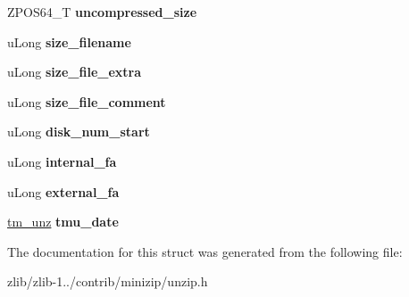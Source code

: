 \begin{DoxyCompactItemize}
\item 
\hypertarget{structunz__file__info64__s_a8cf74465a9d0641cdf1bb22c33f09b42}{Z\+P\+O\+S64\+\_\+\+T {\bfseries uncompressed\+\_\+size}}\label{structunz__file__info64__s_a8cf74465a9d0641cdf1bb22c33f09b42}

\item 
\hypertarget{structunz__file__info64__s_ac09e3b96910b5f98ec73688116b6b3fd}{u\+Long {\bfseries size\+\_\+filename}}\label{structunz__file__info64__s_ac09e3b96910b5f98ec73688116b6b3fd}

\item 
\hypertarget{structunz__file__info64__s_a12af3fa77dc4f7f28448d68703eb8c18}{u\+Long {\bfseries size\+\_\+file\+\_\+extra}}\label{structunz__file__info64__s_a12af3fa77dc4f7f28448d68703eb8c18}

\item 
\hypertarget{structunz__file__info64__s_aff23e3bb5b9a3a8a26aa4f4cfcca7c9c}{u\+Long {\bfseries size\+\_\+file\+\_\+comment}}\label{structunz__file__info64__s_aff23e3bb5b9a3a8a26aa4f4cfcca7c9c}

\item 
\hypertarget{structunz__file__info64__s_ad6ed48daf96d59f810a1ef5167ad39db}{u\+Long {\bfseries disk\+\_\+num\+\_\+start}}\label{structunz__file__info64__s_ad6ed48daf96d59f810a1ef5167ad39db}

\item 
\hypertarget{structunz__file__info64__s_a408c5cd87b4894359e91dcab506212cc}{u\+Long {\bfseries internal\+\_\+fa}}\label{structunz__file__info64__s_a408c5cd87b4894359e91dcab506212cc}

\item 
\hypertarget{structunz__file__info64__s_ac9e0fa204fc992beb62b86163f4736ac}{u\+Long {\bfseries external\+\_\+fa}}\label{structunz__file__info64__s_ac9e0fa204fc992beb62b86163f4736ac}

\item 
\hypertarget{structunz__file__info64__s_a9bf3787641ee4345df714293ee31c51e}{\hyperlink{structtm__unz__s}{tm\+\_\+unz} {\bfseries tmu\+\_\+date}}\label{structunz__file__info64__s_a9bf3787641ee4345df714293ee31c51e}

\end{DoxyCompactItemize}


The documentation for this struct was generated from the following file\+:\begin{DoxyCompactItemize}
\item 
zlib/zlib-\/1../contrib/minizip/unzip.\+h\end{DoxyCompactItemize}
